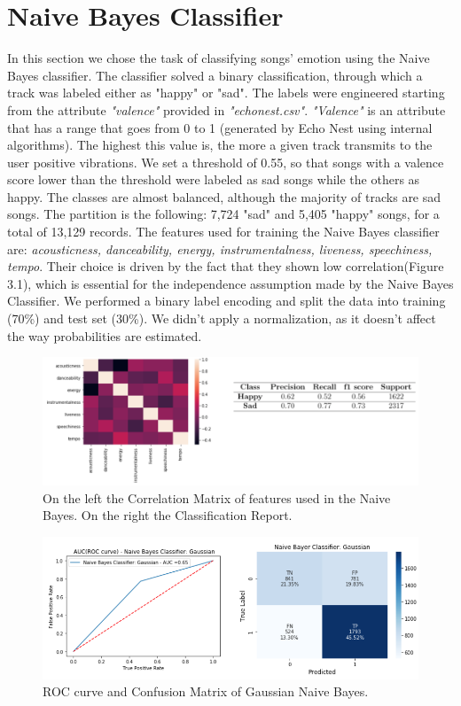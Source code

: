 
\section{Naive Bayes Classifier}
In this section we chose the task of classifying songs' emotion using the Naive Bayes classifier. The classifier solved a binary classification, through which a track was labeled either as "happy" or "sad".
The labels were engineered starting from the attribute \textit{"valence"} provided in \textit{"echonest.csv"}. \textit{"Valence"} is an attribute that has a range that goes from 0 to 1 (generated by Echo Nest using internal algorithms). The highest this value is, the more a given track transmits to the user positive vibrations. We set a threshold of 0.55, so that songs with a valence score lower than the threshold were labeled as sad songs while the others as happy. The classes are almost balanced, although the majority of tracks are sad songs. The partition is the following: 7,724 "sad" and 5,405 "happy" songs, for a total of 13,129 records. The features used for training the Naive Bayes classifier are: \textit{acousticness, danceability, energy, instrumentalness, liveness, speechiness, tempo}. 
Their choice is driven by the fact that they shown low correlation(Figure 3.1), which is essential for the independence assumption made by the Naive Bayes Classifier. We performed a binary label encoding and split the data into training (70\%) and test set (30\%). We didn't apply a normalization, as it doesn't affect the way probabilities are estimated. 

\begin{figure}[!htb]
  \centering
  \includegraphics[width=0.85\linewidth]{images/corr-matrix_scores-naivebayes-classif-report.png}
  \caption{On the left the Correlation Matrix of features used in the Naive Bayes. On the right the Classification Report. }
\end{figure}

\begin{figure}[!htb]
  \centering
  \includegraphics[width=0.7\linewidth]{images/ROC-CFM-Naive-Bayes.png}
  \caption{ROC curve and Confusion Matrix of Gaussian Naive Bayes.}
\end{figure}

